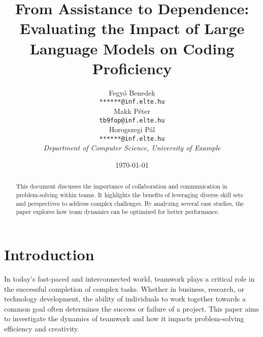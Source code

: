 \documentclass[12pt]{article}  %
\title{From Assistance to Dependence: Evaluating the Impact of Large Language Models on Coding Proficiency}  %
\author{
  Fegyó Benedek\\
  \texttt{******@inf.elte.hu} \\[1ex]
  Makk Péter\\
  \texttt{tb9fop@inf.elte.hu} \\[1ex]
  Horogszegi Pál\\
  \texttt{******@inf.elte.hu} \\[2ex]
  \textit{Department of Computer Science, University of Example}  %
}
\date{\today}  %
\begin{document}
\maketitle

\begin{abstract}
    This document discusses the importance of collaboration and communication in problem-solving within teams. It highlights the benefits of leveraging diverse skill sets and perspectives to address complex challenges. By analyzing several case studies, the paper explores how team dynamics can be optimized for better performance.
\end{abstract}

\section{Introduction}
\label{sec:intro}

In today's fast-paced and interconnected world, teamwork plays a critical role in the successful completion of complex tasks. Whether in business, research, or technology development, the ability of individuals to work together towards a common goal often determines the success or failure of a project. This paper aims to investigate the dynamics of teamwork and how it impacts problem-solving efficiency and creativity.
\end{document}
